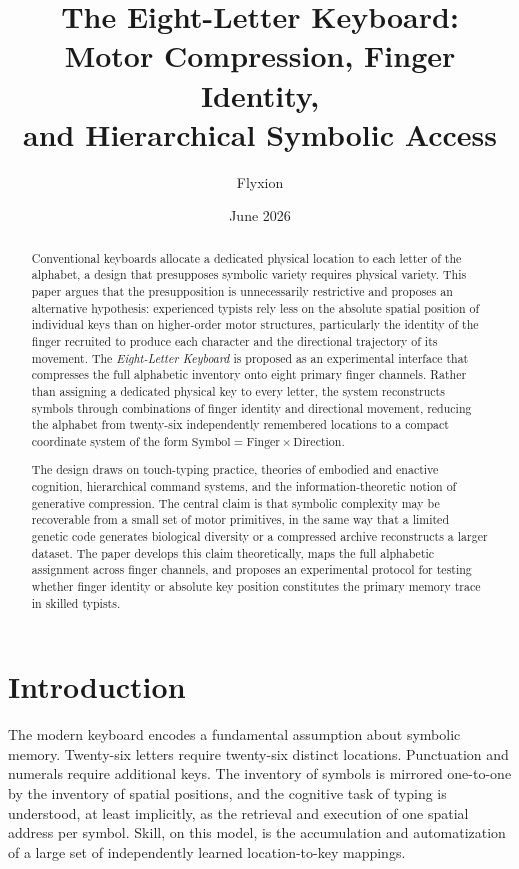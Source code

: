 \documentclass[12pt,a4paper]{article}
\title{\textbf{The Eight-Letter Keyboard:\\
Motor Compression, Finger Identity,\\
and Hierarchical Symbolic Access}}
\author{Flyxion}
\date{June 2026}
\theoremstyle{plain}
\theoremstyle{definition}
\theoremstyle{remark}
\begin{document}
\maketitle

\begin{abstract}
\noindent
Conventional keyboards allocate a dedicated physical location to each letter of
the alphabet, a design that presupposes symbolic variety requires physical
variety. This paper argues that the presupposition is unnecessarily restrictive
and proposes an alternative hypothesis: experienced typists rely less on the
absolute spatial position of individual keys than on higher-order motor
structures, particularly the identity of the finger recruited to produce each
character and the directional trajectory of its movement. The \emph{Eight-Letter
Keyboard} is proposed as an experimental interface that compresses the full
alphabetic inventory onto eight primary finger channels. Rather than assigning a
dedicated physical key to every letter, the system reconstructs symbols through
combinations of finger identity and directional movement, reducing the alphabet
from twenty-six independently remembered locations to a compact coordinate system
of the form $\text{Symbol} = \text{Finger} \times \text{Direction}$.

The design draws on touch-typing practice, theories of embodied and enactive
cognition, hierarchical command systems, and the information-theoretic notion of
generative compression. The central claim is that symbolic complexity may be
recoverable from a small set of motor primitives, in the same way that a limited
genetic code generates biological diversity or a compressed archive reconstructs
a larger dataset. The paper develops this claim theoretically, maps the full
alphabetic assignment across finger channels, and proposes an experimental
protocol for testing whether finger identity or absolute key position constitutes
the primary memory trace in skilled typists.
\end{abstract}

\bigskip

\section{Introduction}

The modern keyboard encodes a fundamental assumption about symbolic memory.
Twenty-six letters require twenty-six distinct locations. Punctuation and
numerals require additional keys. The inventory of symbols is mirrored one-to-one
by the inventory of spatial positions, and the cognitive task of typing is
understood, at least implicitly, as the retrieval and execution of one spatial
address per symbol. Skill, on this model, is the accumulation and automatization
of a large set of independently learned location-to-key mappings.
\end{document}
